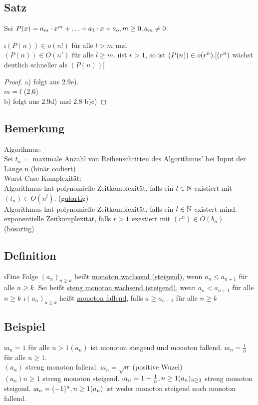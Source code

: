 \subsection{Satz}
Sei $P(x) = a_m \cdot x^m + \ldots + a_1 \cdot x + a_o, m \geq 0, a_m \not = 0$.
\begin{enumerate}[a)]
\i $(P(n)) \in o(n!)$ für alle $l>m$ und\\
$(P(n)) \in O(n')$ für alle $l \geq m$.
\i ist $r > 1$, so ist $(P(n)) \in o(r^n).\\
\lbrack(r^n)$ wächst deutlich schneller als $(P(n))\rbrack$\\
\begin{proof}
a) folgt aus 2.9e).\\
$m = l$ (2.6)\\
b) folgt aus 2.9d) und 2.8 b)c)
\end{proof}
\end{enumerate}
\subsection{Bemerkung}
Algorihmus:\\
Sei $t_n =$ maximale Anzahl von Reihenschritten des Algorithmus' bei Input der Länge n (binär codiert)\\
Worst-Case-Komplexität:\\
Algorithmus hat polynomielle Zeitkomplexität, falls ein $l \in \mathbb{N}$ existiert mit $(t_n) \in O(n^l)$. (\underline{gutartig})\\
Algorithmus hat polynomielle Zeitkomplexität, falls ein $l \in \mathbb{N}$ existert mind. exponentielle Zeitkomplexität, falls 
$ r > 1$ exestiert mit $(r^n) \in O(b_n)$ (\underline{bösartig)}
\subsection{Definition}
\begin{enumerate}[a)]
\i Eine Folge $(a_n)_{n \geq k}$ hei\ss t \underline{monoton wachsend (steigend)}, wenn $a_n \leq a_{n+1}$ f\"ur alle $n \geq k$. Sei hei\ss t \underline{steng monoton wachsend (steigend)}, wenn $a_n < a_{n+1}$ f\"ur alle $n \geq k$
\i $(a_n)_{n \geq k}$ hei\ss t \underline{monoton fallend}, falls $a \geq a_{n+1}$ f\"ur alle $n \geq k$
\end{enumerate}
\subsection{Beispiel}
\begin{enumerate}[a)]
\i $a_n = 1$ f\"ur alle $n > 1
(a_n)$ ist monoton steigend und monoton fallend.
\i $a_n = \frac{1}{n}$ f\"ur alle $n \geq 1$.\\
$(a_n)$ streng monoton fallend.
\i $a_n = \sqrt{n}$ (positive Wuzel)\\
$(a_n){n \geq 1}$ streng monoton steigend.
\i $a_n = 1 - \frac{1}{n}, n \geq 1\\
(a_n)_{n \geq 1}$ streng monoton steigend.
\i $a_n = (-1)^n, n \geq 1\\
(a_n)$ ist weder monoton steigend noch monoton fallend.
\end{enumerate}

